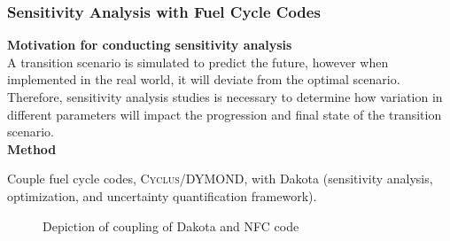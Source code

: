 \begin{frame}
    \frametitle{Sensitivity Analysis with Fuel Cycle Codes}
    \textbf{Motivation for conducting sensitivity analysis}
    \\

    A transition scenario is simulated to predict the 
    future, however when implemented in the real world, 
    it will deviate from the optimal scenario. 
    Therefore, sensitivity analysis studies is necessary to 
    determine how variation in different parameters will impact 
    the progression and final state of the transition scenario. 
    \\

    \textbf{Method}

    Couple fuel cycle codes, \textsc{Cyclus}/DYMOND, 
    with Dakota \cite{eldred_dakota_2010} (sensitivity analysis, 
    optimization, and uncertainty quantification framework).  

    \begin{figure}[]
        \centering
        \caption{Depiction of coupling of Dakota and NFC code}
        \label{fig:dakota-NFC-flow}
    \end{figure}

\end{frame}
